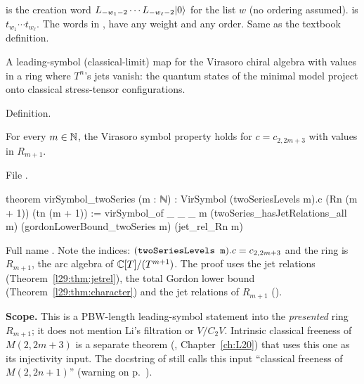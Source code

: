 \begin{dictionary}
 is the creation word $L_{-w_1-2}\cdots L_{-w_\ell-2}|0\rangle$ for the list $w$ (no
ordering assumed).  is $t_{w_1}\cdots t_{w_\ell}$. The words in ,  have
any weight and any order. Same as the textbook definition.
\end{dictionary}

\begin{physics}
A leading-symbol (classical-limit) map for the Virasoro chiral algebra with values in a ring where $T^{n}$'s jets vanish:
the quantum states of the minimal model project onto classical stress-tensor configurations.
\end{physics}

\begin{status}
Definition.
\end{status}

\begin{theorem}\label{l29:thm:virsymbol}
For every $m\in{\mathbb{N}}$, the Virasoro symbol property holds for $c=c_{2,2m+3}$ with values in $R_{m+1}$.
\end{theorem}

\noindent File .
\begin{leancode}
theorem virSymbol_twoSeries (m : ℕ) :
    VirSymbol (twoSeriesLevels m).c (Rn (m + 1)) (tn (m + 1)) :=
  virSymbol_of _ _ _ m (twoSeries_hasJetRelations_all m) (gordonLowerBound_twoSeries m)
    (jet_rel_Rn m)
\end{leancode}

\begin{dictionary}
Full name . Note the indices: $(\lean{twoSeriesLevels m}).c=c_{2,2m+3}$
and the ring is $R_{m+1}$, the arc algebra of ${\mathbb{C}}[T]/(T^{m+1})$. The proof uses the jet relations
(Theorem~\ref{l29:thm:jetrel}), the total Gordon lower bound (Theorem~\ref{l29:thm:character}) and the jet relations of
$R_{m+1}$ ().

\textbf{Scope.} This is a PBW-length leading-symbol statement into the \emph{presented} ring $R_{m+1}$; it does not
mention Li's filtration or $V/C_2V$. Intrinsic classical freeness of $M(2,2m+3)$ is a separate theorem
(, Chapter~\ref{ch:L20}) that uses this one as its injectivity
input. The docstring of  still calls this input ``classical freeness of $M(2,2n+1)$''
(warning on p.~\pageref{l29:warn:stale}).
\end{dictionary}

